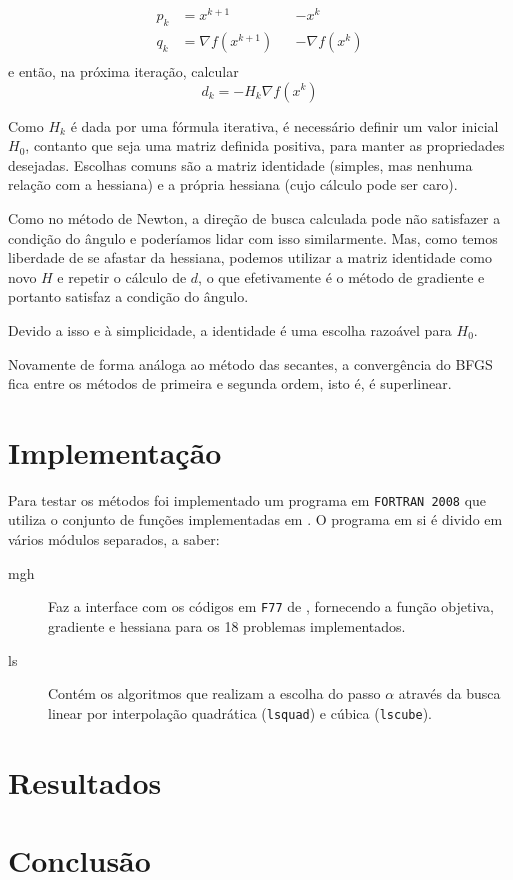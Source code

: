 \documentclass[a4paper,11pt]{article}
\begin{document}
                \begin{equation*}
                    \begin{aligned}
                        p_k &= x^{k+1} & &- x^k \\
                        q_k &= \nabla f(x^{k+1}) & &- \nabla f(x^k) \\
                    \end{aligned}
                \end{equation*}
            e então, na próxima iteração, calcular
                $$ d_k = -H_k\nabla f(x^k) $$

            Como $H_k$ é dada por uma fórmula iterativa, é necessário definir um valor inicial $H_0$, contanto que seja uma matriz definida positiva, para manter as propriedades desejadas. Escolhas comuns são a matriz identidade (simples, mas nenhuma relação com a hessiana) e a própria hessiana (cujo cálculo pode ser caro).

            Como no método de Newton, a direção de busca calculada pode não satisfazer a condição do ângulo e poderíamos lidar com isso similarmente. Mas, como temos liberdade de se afastar da hessiana, podemos utilizar a matriz identidade como novo $H$ e repetir o cálculo de $d$, o que efetivamente é o método de gradiente e portanto satisfaz a condição do ângulo.

            Devido a isso e à simplicidade, a identidade é uma escolha razoável para $H_0$.

            Novamente de forma análoga ao método das secantes, a convergência do BFGS fica entre os métodos de primeira e segunda ordem, isto é, é superlinear.

    \section*{Implementação}
        Para testar os métodos foi implementado um programa em \texttt{FORTRAN 2008} que utiliza o conjunto de  funções implementadas em \citep*{More:1981:AFS:355934.355943}.
        O programa em si é divido em vários módulos separados, a saber:

        \begin{description}
            \item[mgh] Faz a interface com os códigos em \texttt{F77} de \citep*{More:1981:AFS:355934.355943}, fornecendo a função objetiva, gradiente e hessiana para os 18 problemas implementados.
            \item[ls] Contém os algoritmos que realizam a escolha do passo $\alpha$ através da busca linear por interpolação quadrática (\texttt{lsquad}) e cúbica (\texttt{lscube}).
            \item[]
            \item[]
            \item[]
            \item[]
            \item[]

        \end{description}
    \section*{Resultados}
    \section*{Conclusão}

    
\end{document}
